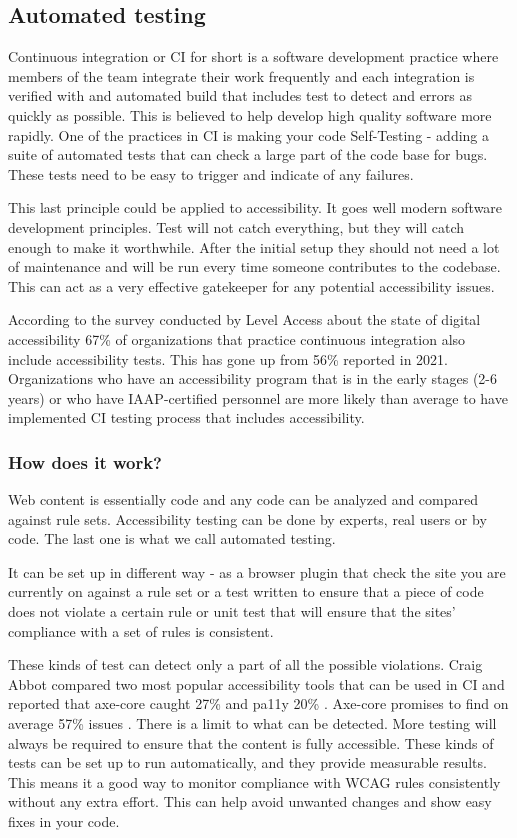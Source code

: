 \documentclass{master_thesis}
\begin{document}
\subsection{Automated testing}
Continuous integration or CI for short  is a software development practice where members of the team integrate their work frequently and each integration is verified with and automated build that includes test to detect and errors as quickly as possible. This is believed to help develop high quality software more rapidly. One of the practices in CI is making your code Self-Testing - adding a suite of automated tests that can check a large part of the code base for bugs. These tests need to be easy to trigger and indicate of any failures.
\citep{Fowler2006}

This last principle could be applied to accessibility. It goes well modern software development principles. Test will not catch everything, but they will catch enough to make it worthwhile. After the initial setup they should not need a lot of maintenance and will be run every time someone contributes to the codebase. This can act as a very effective gatekeeper for any potential accessibility issues.

According to the survey conducted by Level Access about the state of digital accessibility 67\% of organizations that practice continuous integration also include accessibility tests. This has gone up from 56\% reported in 2021. Organizations who have an accessibility program that is in the early stages (2-6 years) or who have IAAP-certified personnel are more likely than average to have implemented CI testing process that includes accessibility. \citep{LevelAccess}

\subsubsection{How does it work?}

Web content is essentially code and any code can be analyzed and compared against rule sets. Accessibility testing can be done by experts, real users or by code. The last one is what we call automated testing.

It can be set up in different way - as a browser plugin that check the site you are currently on against a rule set or a test written to ensure that a piece of code does not violate a certain rule or unit test that will ensure that the sites' compliance with a set of rules is consistent.

These kinds of test can detect only a part of all the possible violations. Craig Abbot compared two most popular accessibility tools that can be used in CI and reported that axe-core caught 27\% and pa11y 20\% \citep{Abbott2021}. Axe-core promises to find on average 57\% issues \citep{Deque2023}. 
There is a limit to what can be detected. More testing will always be required to ensure that the content is fully accessible. These kinds of tests can be set up to run automatically, and they provide measurable results. This means it a good way to monitor compliance with WCAG rules consistently without any extra effort. This can help avoid unwanted changes and show easy fixes in  your code.
\end{document}

